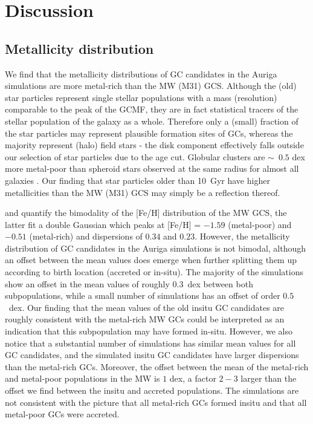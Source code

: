 \documentclass[a4paper,fleqn,usenatbib]{mnras}
\begin{document}
\section{Discussion}
\label{sec:discussion}
\subsection{Metallicity distribution}
\label{sec:discussion_FeH}
We find that the metallicity distributions of GC candidates in the Auriga
simulations are more metal-rich than the MW (M31) GCS. Although the (old) star
particles represent single stellar populations with a mass (resolution) comparable
to the peak of the GCMF, they are in fact statistical tracers of the stellar
population of the galaxy as a whole. Therefore only a (small) fraction of the
star particles may represent plausible formation sites of GCs, whereas the majority
represent (halo) field stars - the disk component effectively falls outside
our selection of star particles due to the age cut. Globular clusters are
$\sim$~$0.5$ dex more metal-poor than spheroid stars observed at the same radius
for almost all galaxies \citep{1991ARA&A..29..543H}. Our finding that star particles older
than 10~Gyr have higher metallicities than the MW (M31) GCS may simply be a
reflection thereof.

\citet[][p. 234]{1998gcs..book.....A} and \citet[][p. 38]{Harris2001} quantify
the bimodality of the [Fe/H] distribution of the MW GCS, the latter fit a double
Gaussian which peaks at [Fe/H] = $-1.59$ (metal-poor) and $-0.51$ (metal-rich)
and dispersions of $0.34$ and $0.23$. However, the metallicity distribution of
GC candidates in the Auriga simulations is not bimodal, although an offset between
the mean values does emerge when further splitting them up according to birth location
(accreted or in-situ). The majority of the simulations show an offset in the mean
values of roughly $0.3$~dex between both subpopulations, while a small number of
simulations has an offset of order $0.5$~dex. Our finding that the mean values of
the old insitu GC candidates are roughly consistent with the metal-rich MW GCs
could be interpreted as an indication that this subpopulation may have formed
in-situ. However, we also notice that a substantial number of simulations has
similar mean values for all GC candidates, and the simulated insitu GC candidates
have larger dispersions than the metal-rich GCs. Moreover, the offset between the
mean of the metal-rich and metal-poor populations in the MW is $1$ dex, a factor
$2-3$ larger than the offset we find between the insitu and accreted populations.
The simulations are not consistent with the picture that all metal-rich GCs
formed insitu and that all metal-poor GCs were accreted.
\end{document}
